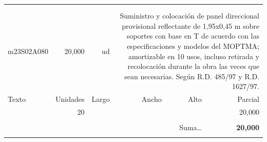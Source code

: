 \documentclass{book}%
\begin{document}
\begin{longtable}{lrrrrr}
\hline%
&&&&&\\%
&&&&&\\%
m23S02A080&    20,000& ud&\multicolumn{3}{p{6cm}}{\scriptsize Suministro y colocación de panel direccional provisional reflectante de 1,95x0,45 m sobre soportes con base en T de acuerdo con las especificaciones y modelos del MOPTMA; amortizable en 10 usos, incluso retirada y recolocación durante la obra las veces que sean necesarias. Según R.D. 485/97 y R.D. 1627/97.\normalsize}\\%
Texto&Unidades&Largo&Ancho&Alto&Parcial\\%
\hline%
\multicolumn{1}{p{3.5cm}}{ }&20&&&&    20,000\\%
&&&&&\\%
\multicolumn{5}{r}{Suma\ldots}&\textbf{    20,000}\\%
\hline%
&&&&&\\%
\end{longtable}%
\newpage

%
\end{document}
